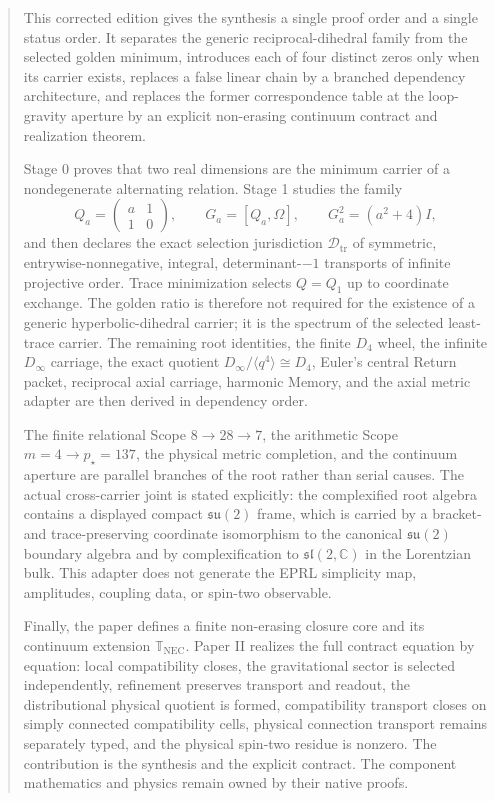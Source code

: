 \documentclass[11pt]{article}
\newcommand{\C}{\mathbb C}
\newcommand{\NEC}{\mathbb T_{\mathrm{NEC}}}
\newcommand{\Dtr}{\mathcal D_{\mathrm{tr}}}
\begin{document}
\begin{abstract}
This corrected edition gives the synthesis a single proof order and a single status order. It separates the generic reciprocal-dihedral family from the selected golden minimum, introduces each of four distinct zeros only when its carrier exists, replaces a false linear chain by a branched dependency architecture, and replaces the former correspondence table at the loop-gravity aperture by an explicit non-erasing continuum contract and realization theorem.

Stage 0 proves that two real dimensions are the minimum carrier of a nondegenerate alternating relation. Stage 1 studies the family
\[
Q_a=\begin{pmatrix}a&1\\1&0\end{pmatrix},
\qquad
G_a=[Q_a,\Omega],
\qquad
G_a^2=(a^2+4)I,
\]
and then declares the exact selection jurisdiction $\Dtr$ of symmetric, entrywise-nonnegative, integral, determinant-$-1$ transports of infinite projective order. Trace minimization selects $Q=Q_1$ up to coordinate exchange. The golden ratio is therefore not required for the existence of a generic hyperbolic-dihedral carrier; it is the spectrum of the selected least-trace carrier. The remaining root identities, the finite $D_4$ wheel, the infinite $D_\infty$ carriage, the exact quotient $D_\infty/\langle q^4\rangle\cong D_4$, Euler's central Return packet, reciprocal axial carriage, harmonic Memory, and the axial metric adapter are then derived in dependency order.

The finite relational Scope $8\to28\to7$, the arithmetic Scope $m=4\to p_\star=137$, the physical metric completion, and the continuum aperture are parallel branches of the root rather than serial causes. The actual cross-carrier joint is stated explicitly: the complexified root algebra contains a displayed compact $\mathfrak{su}(2)$ frame, which is carried by a bracket- and trace-preserving coordinate isomorphism to the canonical $\mathfrak{su}(2)$ boundary algebra and by complexification to $\mathfrak{sl}(2,\C)$ in the Lorentzian bulk. This adapter does not generate the EPRL simplicity map, amplitudes, coupling data, or spin-two observable.

Finally, the paper defines a finite non-erasing closure core and its continuum extension $\NEC$. Paper II realizes the full contract equation by equation: local compatibility closes, the gravitational sector is selected independently, refinement preserves transport and readout, the distributional physical quotient is formed, compatibility transport closes on simply connected compatibility cells, physical connection transport remains separately typed, and the physical spin-two residue is nonzero. The contribution is the synthesis and the explicit contract. The component mathematics and physics remain owned by their native proofs.
\end{abstract}
\end{document}

